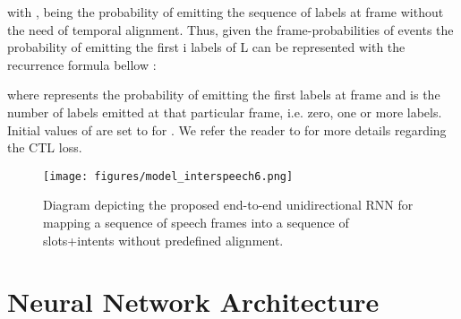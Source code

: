 \documentclass[a4paper]{article}
\begin{document}
\noindent with , being the probability of emitting the sequence of labels  at frame  without the need of temporal alignment. Thus, given the frame-probabilities of events  the probability of emitting the first i labels of L can be represented with the recurrence formula bellow \cite{wang2019connectionist}: 



\noindent where  represents the probability of emitting the first  labels at frame  and  is the number of labels emitted at that particular frame, i.e. zero, one or more labels. Initial values of  are set to  for . We refer the reader to \cite{wang2019connectionist} for more details regarding the CTL loss.


\begin{figure}
\centering
  \texttt{[image: figures/model\_interspeech6.png]}
  \caption{Diagram depicting the proposed end-to-end unidirectional RNN for mapping a sequence of speech frames into a sequence of slots+intents without predefined alignment.}
  \label{fig:model_architecture}
\end{figure}

\section{Neural Network Architecture}
\label{sec:model_arch}
\end{document}
